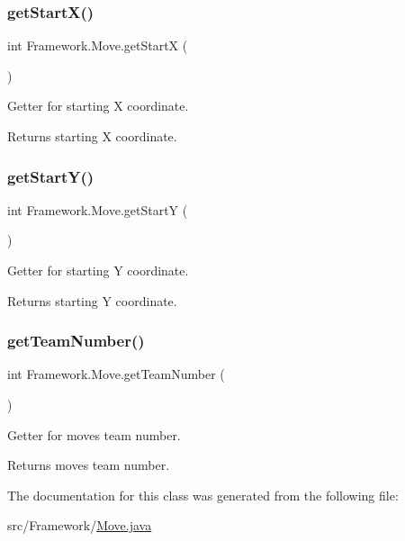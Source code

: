 \subsubsection{\texorpdfstring{get\+Start\+X()}{getStartX()}}
{\footnotesize\ttfamily int Framework.\+Move.\+get\+StartX (\begin{DoxyParamCaption}{ }\end{DoxyParamCaption})}

Getter for starting X coordinate. \begin{DoxyReturn}{Returns}
starting X coordinate. 
\end{DoxyReturn}
\hypertarget{class_framework_1_1_move_ac1f0fed6c7606b78d2ff2707f2b768a9}{}\label{class_framework_1_1_move_ac1f0fed6c7606b78d2ff2707f2b768a9} 
\subsubsection{\texorpdfstring{get\+Start\+Y()}{getStartY()}}
{\footnotesize\ttfamily int Framework.\+Move.\+get\+StartY (\begin{DoxyParamCaption}{ }\end{DoxyParamCaption})}

Getter for starting Y coordinate. \begin{DoxyReturn}{Returns}
starting Y coordinate. 
\end{DoxyReturn}
\hypertarget{class_framework_1_1_move_ab5f197f193dbc46f5e49caf1389a1eb3}{}\label{class_framework_1_1_move_ab5f197f193dbc46f5e49caf1389a1eb3} 
\subsubsection{\texorpdfstring{get\+Team\+Number()}{getTeamNumber()}}
{\footnotesize\ttfamily int Framework.\+Move.\+get\+Team\+Number (\begin{DoxyParamCaption}{ }\end{DoxyParamCaption})}

Getter for move\textquotesingle{}s team number. \begin{DoxyReturn}{Returns}
move\textquotesingle{}s team number. 
\end{DoxyReturn}


The documentation for this class was generated from the following file\+:\begin{DoxyCompactItemize}
\item 
src/\+Framework/\hyperlink{_move_8java}{Move.\+java}\end{DoxyCompactItemize}

